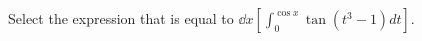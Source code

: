 \documentclass{ximera}
\author{Nela Lakos \and Kyle Parsons}
\begin{document}
\begin{exercise}

Select the expression that is equal to $\dd{x}\left[\int_0^{\cos x} \tan\left(t^3-1\right) dt\right]$.
\begin{multipleChoice}
\end{multipleChoice}

\end{exercise}
\end{document}
